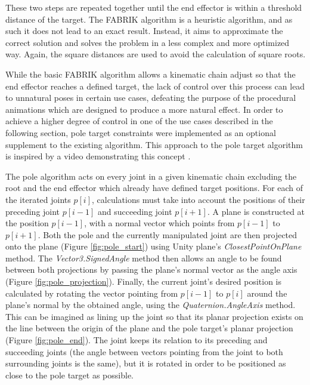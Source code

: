 These two steps are repeated together until the end effector is within
a threshold distance of the target. The FABRIK algorithm is a heuristic
algorithm, and as such it does not lead to an exact result. Instead, it aims to
approximate the correct solution and solves the problem in a less complex and
more optimized way. Again, the square distances are used to avoid the
calculation of square roots. 

While the basic FABRIK algorithm allows a kinematic chain adjust so that the end
effector reaches a defined target, the lack of control over this process can
lead to unnatural poses in certain use cases, defeating the purpose of the
procedural animations which are designed to produce a more natural effect. In
order to achieve a higher degree of control in one of the use cases described in
the following section, pole target constraints were implemented as an optional
supplement to the existing algorithm. This approach to the pole target algorithm
is inspired by a video demonstrating this concept \cite{youtube_ik}. 

The pole algorithm acts on every joint in a given kinematic chain excluding the
root and the end effector which already have defined target positions. For each
of the iterated joints \(p[i]\), calculations must take into account the
positions of their preceding joint \(p[i-1]\) and succeeding joint \(p[i+1]\).
A plane is constructed at the position \(p[i-1]\), with a normal vector which
points from \(p[i-1]\) to \(p[i+1]\). Both the pole and the currently
manipulated joint are then projected onto the plane (Figure
\ref{fig:pole_start}) using Unity plane's \textit{ClosestPointOnPlane} method.
The \textit{Vector3.SignedAngle} method then allows an angle to be found between
both projections by passing the plane's normal vector as the angle axis (Figure
\ref{fig:pole_projection}). Finally, the current joint's desired position is
calculated by rotating the vector pointing from \(p[i-1]\) to \(p[i]\) around
the plane's normal by the obtained angle, using the
\textit{Quaternion.AngleAxis} method. This can be imagined as lining up the
joint so that its planar projection exists on the line between the origin of the
plane and the pole target's planar projection (Figure \ref{fig:pole_end}). The
joint keeps its relation to its preceding and succeeding joints (the angle
between vectors pointing from the joint to both surrounding joints is the same),
but it is rotated in order to be positioned as close to the pole target as
possible.

